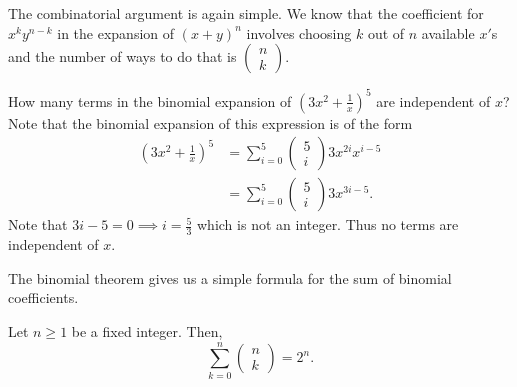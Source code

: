 \begin{rem*}
The combinatorial argument is again simple. We know that the coefficient
for $x^{k}y^{n-k}$ in the expansion of $\left(x+y\right)^{n}$ involves
choosing $k$ out of $n$ available $x'$s and the number of ways
to do that is $\left(\begin{array}{c}
n\\
k
\end{array}\right)$.
\end{rem*}
\begin{example}
\label{exa:isi2016psa1}How many terms in the binomial expansion
of $\left(3x^{2}+\frac{1}{x}\right)^{5}$ are independent of $x$?
Note that the binomial expansion of this expression is of the form
\begin{align*}
\left(3x^{2}+\frac{1}{x}\right)^{5} & =\sum_{i=0}^{5}\left(\begin{array}{c}
5\\
i
\end{array}\right)3x^{2i}x^{i-5}\\
 & =\sum_{i=0}^{5}\left(\begin{array}{c}
5\\
i
\end{array}\right)3x^{3i-5}.
\end{align*}
Note that $3i-5=0\implies i=\frac{5}{3}$ which is not an integer.
Thus no terms are independent of $x.$
\end{example}

The binomial theorem gives us a simple formula for the sum of binomial
coefficients.
\begin{cor}
\label{cor:sumOfBinomialCoefficients}Let $n\geq1$ be a fixed integer.
Then,
\[
\sum_{k=0}^{n}\left(\begin{array}{c}
n\\
k
\end{array}\right)=2^{n}.
\]
\end{cor}

